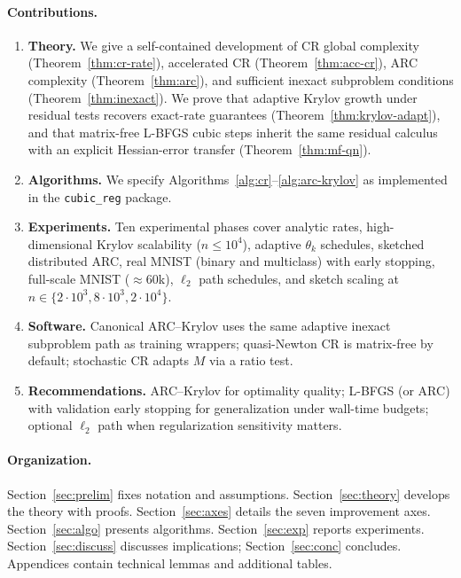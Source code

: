 \documentclass[11pt,a4paper]{article}
\begin{document}
\paragraph{Contributions.}
\begin{enumerate}[leftmargin=*,itemsep=2pt]
  \item \textbf{Theory.} We give a self-contained development of CR global complexity (Theorem~\ref{thm:cr-rate}), accelerated CR (Theorem~\ref{thm:acc-cr}), ARC complexity (Theorem~\ref{thm:arc}), and sufficient inexact subproblem conditions (Theorem~\ref{thm:inexact}). We prove that adaptive Krylov growth under residual tests recovers exact-rate guarantees (Theorem~\ref{thm:krylov-adapt}), and that matrix-free L-BFGS cubic steps inherit the same residual calculus with an explicit Hessian-error transfer (Theorem~\ref{thm:mf-qn}).
  \item \textbf{Algorithms.} We specify Algorithms~\ref{alg:cr}--\ref{alg:arc-krylov} as implemented in the \texttt{cubic\_reg} package.
  \item \textbf{Experiments.} Ten experimental phases cover analytic rates, high-dimensional Krylov scalability ($n\le 10^{4}$), adaptive $\theta_{k}$ schedules, sketched distributed ARC, real MNIST (binary and multiclass) with early stopping, full-scale MNIST ($\approx 60$k), $\ell_{2}$ path schedules, and sketch scaling at $n\in\{2{\cdot}10^{3},8{\cdot}10^{3},2{\cdot}10^{4}\}$.
  \item \textbf{Software.} Canonical ARC--Krylov uses the same adaptive inexact subproblem path as training wrappers; quasi-Newton CR is matrix-free by default; stochastic CR adapts $M$ via a ratio test.
  \item \textbf{Recommendations.} ARC--Krylov for optimality quality; L-BFGS (or ARC) with validation early stopping for generalization under wall-time budgets; optional $\ell_{2}$ path when regularization sensitivity matters.
\end{enumerate}

\paragraph{Organization.}
Section~\ref{sec:prelim} fixes notation and assumptions.
Section~\ref{sec:theory} develops the theory with proofs.
Section~\ref{sec:axes} details the seven improvement axes.
Section~\ref{sec:algo} presents algorithms.
Section~\ref{sec:exp} reports experiments.
Section~\ref{sec:discuss} discusses implications; Section~\ref{sec:conc} concludes.
Appendices contain technical lemmas and additional tables.
\end{document}
